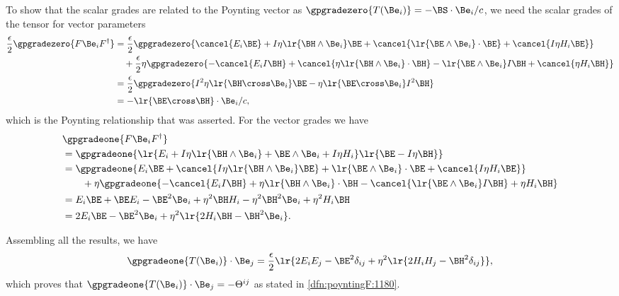 To show that the scalar grades are related to the Poynting vector as \( \gpgradezero{T(\Be_i)} = - \BS \cdot \Be_i/ c \), we need the scalar grades of the tensor for vector parameters
\begin{equation}\label{eqn:stressTensorAlgebraically:1180}
\begin{aligned}
\frac{\epsilon}{2} \gpgradezero{ F \Be_i F^\dagger }
&=
\frac{\epsilon}{2} \gpgradezero{
   \cancel{E_i \BE}
   + I \eta \lr{ \BH \wedge \Be_i } \BE
   + \cancel{\lr{\BE \wedge \Be_i } \cdot \BE}
   + \cancel{I \eta H_i \BE}
} \\
&\quad+ \frac{\epsilon}{2} \eta
\gpgradezero{
   - \cancel{E_i I \BH}
   + \cancel{\eta \lr{ \BH \wedge \Be_i } \cdot \BH}
   - \lr{ \BE \wedge \Be_i } I \BH
   + \cancel{\eta H_i \BH}
} \\
&=
\frac{\epsilon}{2} \gpgradezero{
   I^2 \eta \lr{ \BH \cross \Be_i } \BE
   - \eta \lr{ \BE \cross \Be_i } I^2 \BH
} \\
&=
- \lr{ \BE \cross \BH } \cdot \Be_i/c,
\end{aligned}
\end{equation}
which is the Poynting relationship that was asserted.
For the vector grades we have
\begin{equation}\label{eqn:stressTensorAlgebraically:1140}
\begin{aligned}
&\gpgradeone{ F \Be_i F^\dagger } \\
&=
\gpgradeone{
\lr{
   E_i
   + I \eta \lr{ \BH \wedge \Be_i }
   + \BE \wedge \Be_i
   + I \eta H_i
}
\lr{
   \BE - I \eta \BH
}
} \\
&=
\gpgradeone{
   E_i \BE
   + \cancel{I \eta \lr{ \BH \wedge \Be_i } \BE}
   + \lr{\BE \wedge \Be_i } \cdot \BE
   + \cancel{I \eta H_i \BE}
} \\
&\qquad + \eta
\gpgradeone{
   - \cancel{E_i I \BH}
   + \eta \lr{ \BH \wedge \Be_i } \cdot \BH
   - \cancel{\lr{ \BE \wedge \Be_i } I \BH}
   + \eta H_i \BH
} \\
&=
   E_i \BE
   + \BE E_i - \BE^2 \Be_i
   + \eta^2 \BH H_i - \eta^2 \BH^2 \Be_i
   + \eta^2 H_i \BH \\
&=
   2 E_i \BE - \BE^2 \Be_i
   + \eta^2 \lr{ 2 H_i \BH - \BH^2 \Be_i }.
\end{aligned}
\end{equation}

Assembling all the results, we have
\begin{equation}\label{eqn:stressTensorAlgebraically:1160}
\gpgradeone{T(\Be_i)} \cdot \Be_j
=
\frac{\epsilon}{2}
\lr{
   2 E_i E_j - \BE^2 \delta_{ij}
   + \eta^2 \lr{ 2 H_i H_j - \BH^2 \delta_{ij} }
},
\end{equation}
which proves that \( \gpgradeone{T(\Be_i)} \cdot \Be_j = -\Theta^{ij} \) as stated in
\cref{dfn:poyntingF:1180}.
